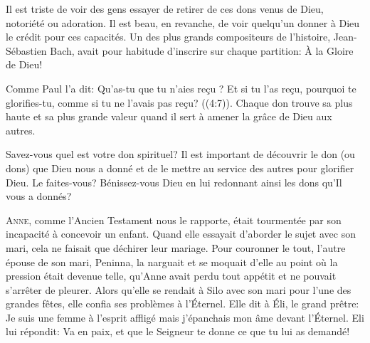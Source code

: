 
Il est triste de voir des gens essayer de retirer de ces dons venus de Dieu,
 notoriété ou adoration. Il est beau, en revanche, de voir quelqu'un donner
 à Dieu le crédit pour ces capacités.
 Un des plus grands compositeurs de l'histoire, Jean-Sébastien Bach,
 avait pour habitude d'inscrire sur chaque partition: 
 \Og À la Gloire de Dieu! \Fg{}

Comme Paul l'a dit: 
 \Og Qu'as-tu que tu n'aies re\c{c}u ? Et si tu l'as re\c{c}u,
 pourquoi te glorifies-tu, comme si tu ne l'avais pas re\c{c}u?
 ((4:7)).
 Chaque don trouve sa plus haute et sa plus grande valeur
 quand il sert à amener la grâce de Dieu aux autres.

Savez-vous quel est votre don spirituel? Il est important de découvrir le don
 (ou dons) que Dieu nous a donné et de le mettre au service des autres
 pour glorifier Dieu. Le faites-vous? Bénissez-vous Dieu en lui redonnant
 ainsi les dons qu'Il vous a donnés?

\dvrule






\lettrine{A}{nne,} comme l'Ancien Testament nous le rapporte,
 était tourmentée par son incapacité à concevoir un enfant.
 Quand elle essayait d'aborder le sujet avec son mari,
 cela ne faisait que déchirer leur mariage. Pour couronner le tout,
 l'autre épouse de son mari, Peninna, la narguait et se moquait d'elle
 au point où la pression était devenue telle, qu'Anne avait perdu
 tout appétit et ne pouvait s'arrêter de pleurer.
 Alors qu'elle se rendait à Silo avec son mari pour l'une des grandes fêtes,
 elle confia ses problèmes à l'Éternel.
 Elle dit à Éli, le grand prêtre: 
 \Og Je suis une femme à l'esprit affligé mais j'épanchais mon âme
 devant l'Éternel. \Fg{}
 Eli lui répondit: 
 \Og Va en paix, et que le Seigneur te donne ce que tu lui as demandé! \Fg{}

